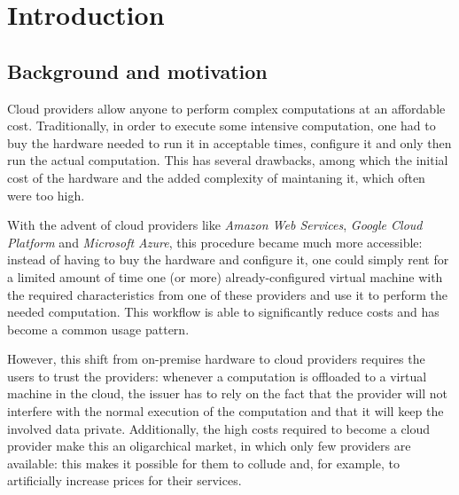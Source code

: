 
\section{Introduction}

\subsection{Background and motivation}
Cloud providers allow anyone to perform complex computations at an affordable cost. Traditionally, in order to execute some intensive computation, one had to buy the hardware needed to run it in acceptable times, configure it and only then run the actual computation. This has several drawbacks, among which the initial cost of the hardware and the added complexity of maintaning it, which often were too high.

With the advent of cloud providers like \emph{Amazon Web Services}, \emph{Google Cloud Platform} and \emph{Microsoft Azure}, this procedure became much more accessible: instead of having to buy the hardware and configure it, one could simply rent for a limited amount of time one (or more) already-configured virtual machine with the required characteristics from one of these providers and use it to perform the needed computation. This workflow is able to significantly reduce costs and has become a common usage pattern.

However, this shift from on-premise hardware to cloud providers requires the users to trust the providers: whenever a computation is offloaded to a virtual machine in the cloud, the issuer has to rely on the fact that the provider will not interfere with the normal execution of the computation and that it will keep the involved data private. Additionally, the high costs required to become a cloud provider make this an oligarchical market, in which only few providers are available: this makes it possible for them to collude and, for example, to artificially increase prices for their services.

